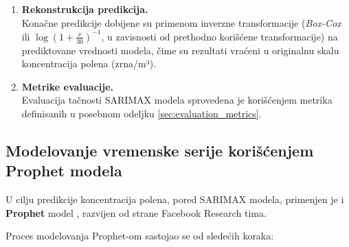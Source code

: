 \documentclass[12pt]{article}
\begin{document}
\begin{enumerate}
    \item \textbf{Rekonstrukcija predikcija.} \\
    Konačne predikcije dobijene su primenom inverzne transformacije (\textit{Box-Cox} ili $\log(1 + \frac{x}{30})^{-1}$, u zavisnosti od prethodno korišćene transformacije) na prediktovane vrednosti modela, čime su rezultati vraćeni u originalnu skalu koncentracija polena (zrna/m³).

    \item \textbf{Metrike evaluacije.} \\
    Evaluacija tačnosti SARIMAX modela sprovedena je korišćenjem metrika definisanih u posebnom odeljku \ref{sec:evaluation_metrics}.

\end{enumerate}

\subsection{Modelovanje vremenske serije korišćenjem Prophet modela}

U cilju predikcije koncentracija polena, pored SARIMAX modela, primenjen je i \textbf{Prophet} model \cite{taylor2018}, razvijen od strane Facebook Research tima.

Proces modelovanja Prophet-om sastojao se od sledećih koraka:
\end{document}
